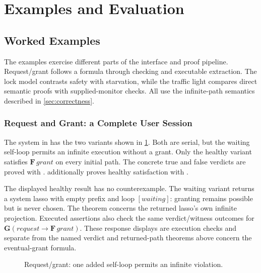 \section{Examples and Evaluation}\label{sec:evaluation}

\subsection{Worked Examples}

The examples exercise different parts of the interface and proof pipeline.
Request/grant follows a formula through checking and executable extraction.
The lock model contrasts safety with starvation, while the traffic light
compares direct semantic proofs with supplied-monitor checks. All use the
infinite-path semantics described in \cref{sec:correctness}.

\subsubsection{Request and Grant: a Complete User Session}

The system in  has the two
variants shown in \cref{fig:example-request-grant}. Both are serial, but the
waiting self-loop permits an infinite execution without a grant. Only the
healthy variant satisfies $\mathbf{F}\,\mathit{grant}$ on every initial
path. The concrete true and false verdicts are proved with
.  additionally
proves healthy satisfaction with .

The displayed healthy result has no counterexample. The waiting variant
returns a system lasso with empty prefix and loop $[\mathit{waiting}]$:
granting remains possible but is never chosen. The theorem
 concerns the returned lasso's own infinite
projection. Executed assertions also check the same verdict/witness outcomes
for $\mathbf{G}(\mathit{request}\rightarrow\mathbf{F}\,\mathit{grant})$.
These response displays are execution checks and separate from the named verdict and
returned-path theorems above concern the eventual-grant formula.

\begin{figure}[!ht]
  \centering
  \resizebox{\linewidth}{!}{}
  \caption{Request/grant: one added self-loop permits an infinite violation.}
  \label{fig:example-request-grant}
\end{figure}

